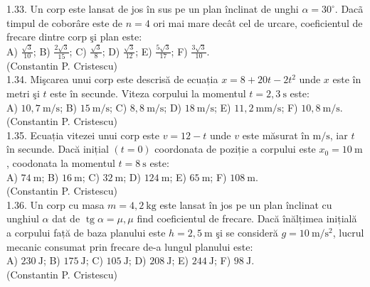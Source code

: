 1.33. Un corp este lansat de jos în sus pe un plan înclinat de unghi $\alpha=30^{\circ}$. Dacã timpul de coborâre este de $n=4$ ori mai mare decât cel de urcare, coeficientul de frecare dintre corp şi plan este:\\ A) $\frac{\sqrt{3}}{10}$; B) $\frac{2 \sqrt{3}}{15}$; C) $\frac{\sqrt{3}}{8}$; D) $\frac{\sqrt{3}}{12}$; E) $\frac{5 \sqrt{3}}{17}$; F) $\frac{3 \sqrt{3}}{10}$.\\ (Constantin P. Cristescu)\\

1.34. Mişcarea unui corp este descrisă de ecuația $x=8+20 t-2 t^{2}$ unde $x$ este în metri şi $t$ este în secunde. Viteza corpului la momentul $t=2,3 \mathrm{~s}$ este:\\ A) $10,7 \mathrm{~m} / \mathrm{s}$; B) $15 \mathrm{~m} / \mathrm{s}$; C) $8,8 \mathrm{~m} / \mathrm{s}$; D) $18 \mathrm{~m} / \mathrm{s}$; E) $11,2 \mathrm{~mm} / \mathrm{s}$; F) $10,8 \mathrm{~m} / \mathrm{s}$.\\ (Constantin P. Cristescu)\\

1.35. Ecuația vitezei unui corp este $v=12-t$ unde $v$ este măsurat în $\mathrm{m} / \mathrm{s}$, iar $t$ în secunde. Dacă inițial $(t=0)$ coordonata de poziție a corpului este $x_{0}=10 \mathrm{~m}$, coodonata la momentul $t=8 \mathrm{~s}$ este:\\ A) $74 \mathrm{~m}$; B) $16 \mathrm{~m}$; C) $32 \mathrm{~m}$; D) $124 \mathrm{~m}$; E) $65 \mathrm{~m}$; F) $108 \mathrm{~m}$.\\ (Constantin P. Cristescu)\\

1.36. Un corp cu masa $m=4,2 \mathrm{~kg}$ este lansat în jos pe un plan înclinat cu unghiul $\alpha$ dat de $\operatorname{tg} \alpha=\mu, \mu$ find coeficientul de frecare. Dacă înălțimea inițială a corpului față de baza planului este $h=2,5 \mathrm{~m}$ şi se consideră $g=10 \mathrm{~m} / \mathrm{s}^{2}$, lucrul mecanic consumat prin frecare de-a lungul planului este:\\ A) $230 \mathrm{~J}$; B) $175 \mathrm{~J}$; C) $105 \mathrm{~J}$; D) $208 \mathrm{~J}$; E) $244 \mathrm{~J}$; F) $98 \mathrm{~J}$.\\ (Constantin P. Cristescu)\\

